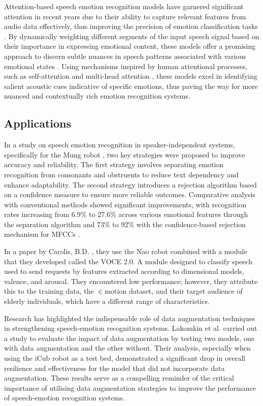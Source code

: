 Attention-based speech emotion recognition models have garnered significant attention in recent years due to their ability to capture relevant features from audio data effectively, thus improving the precision of emotion classification tasks \cite{Peng2020-wv}. By dynamically weighting different segments of the input speech signal \cite{Zhichao2020-bf} based on their importance in expressing emotional content, these models offer a promising approach to discern subtle nuances in speech patterns associated with various emotional states \cite{Nie2022-fo}. Using mechanisms inspired by human attentional processes, such as self-attention and multi-head attention \cite{Rasendrasoa2022-nf}, these models excel in identifying salient acoustic cues indicative of specific emotions, thus paving the way for more nuanced and contextually rich emotion recognition systems.

\subsection{Applications}

In a study on speech emotion recognition in speaker-independent systems, specifically for the Mung robot \cite{Kim2009-in}, two key strategies were proposed to improve accuracy and reliability. The first strategy involves separating emotion recognition from consonants and obstruents to reduce text dependency and enhance adaptability. The second strategy introduces a rejection algorithm based on a confidence measure to ensure more reliable outcomes. Comparative analysis with conventional methods showed significant improvements, with recognition rates increasing from 6.9\% to 27.6\% across various emotional features through the separation algorithm and 73\% to 92\% with the confidence-based rejection mechanism for MFCCs \cite{Kim2018-dh}.

In a paper by Carolis, B.D. \cite{Carolis2016-ig}, they use the Nao robot combined with a module that they developed called the VOCE 2.0. A module designed to classify speech used to send requests by features extracted according to dimensional models, valence, and arousal. They encountered low performance; however, they attribute this to the training data, the \begin{math} \in{} \end{math}motion dataset, and their target audience of elderly individuals, which have a different range of characteristics.

Research has highlighted the indispensable role of data augmentation techniques in strengthening speech-emotion recognition systems. Lakomkin et al. \cite{Lakomkin2018-ws} carried out a study to evaluate the impact of data augmentation by testing two models, one with data augmentation and the other without. Their analysis, especially when using the iCub robot as a test bed, demonstrated a significant drop in overall resilience and effectiveness for the model that did not incorporate data augmentation. These results serve as a compelling reminder of the critical importance of utilising data augmentation strategies to improve the performance of speech-emotion recognition systems.

